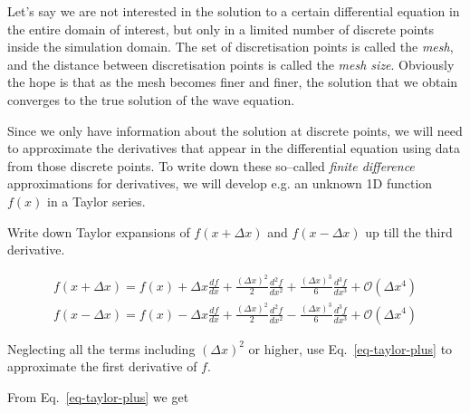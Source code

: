 \pagebreak


Let's say we are not interested in the solution to a certain differential equation in the entire domain of interest, but only in a limited number of discrete points inside the simulation domain. The set of discretisation points is called the \emph{mesh}, and the distance between discretisation points is called the \emph{mesh size}. Obviously the hope is that as the mesh becomes finer and finer, the solution that we obtain converges to the true solution of the wave equation.

Since we only have information about the solution at discrete points, we will need to approximate the derivatives that appear in the differential equation using data from those discrete points. To write down these so--called \emph{finite difference} approximations for derivatives, we will develop e.g. an unknown 1D function $f(x)$ in a Taylor series.

\begin{cue}
\noindent{}Write down Taylor expansions of $f(x+\Delta x)$ and $f(x-\Delta x)$ up till the third derivative. 
\end{cue}

\begin{gather}
f(x+\Delta x) = f(x) + \Delta x \frac{d f}{d x} + \frac{{(\Delta x)}^2}{2} \frac{d^2 f}{d x^2} + \frac{{(\Delta x)}^3}{6} \frac{d^3 f}{d x^3} + \mathcal{O}\left(\Delta x^4\right) \label{eq-taylor-plus} \\
f(x-\Delta x) = f(x) - \Delta x \frac{d f}{d x} + \frac{{(\Delta x)}^2}{2} \frac{d^2 f}{d x^2} - \frac{{(\Delta x)}^3}{6} \frac{d^3 f}{d x^3} + \mathcal{O}\left(\Delta x^4\right) \label{eq-taylor-min}
\end{gather} 

\begin{cue}
Neglecting all the terms including $\left(\Delta x\right)^2$ or higher, use Eq.~\ref{eq-taylor-plus} to approximate the first derivative of $f$.
\end{cue}

From Eq.~\ref{eq-taylor-plus} we get

